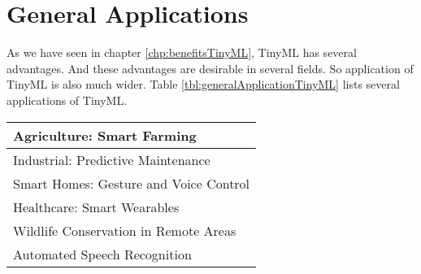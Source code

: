 \documentclass[../../main]{subfiles}
\begin{document}
\section{General Applications} \label{sec:}

As we have seen in chapter \ref{chp:benefitsTinyML}, TinyML has several advantages.
And these advantages are desirable in several fields. So application of TinyML is
also much wider. Table \ref{tbl:generalApplicationTinyML} lists several applications
of TinyML.

\begin{center}

    \renewcommand\arraystretch{1.75}

    \begin{tabularx} {\textwidth} {
            >{\centering\arraybackslash}X
        }

        \toprule
        \midrule

        Agriculture: Smart Farming \\ \midrule
        Industrial: Predictive Maintenance \\ \midrule
        Smart Homes: Gesture and Voice Control \\ \midrule
        Healthcare: Smart Wearables \\ \midrule
        Wildlife Conservation in Remote Areas \\ \midrule
        Automated Speech Recognition \\

        \midrule
        \bottomrule

    \end{tabularx}

    \label{tbl:generalApplicationTinyML}

\end{center}
\end{document}
